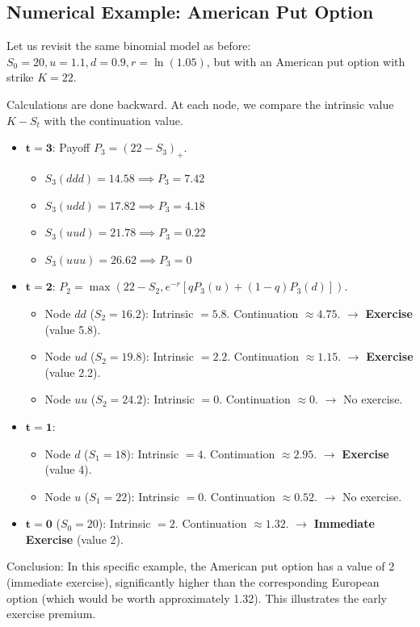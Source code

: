 \subsection{Numerical Example: American Put Option}
Let us revisit the same binomial model as before: $S_0=20, u=1.1, d=0.9, r=\ln(1.05)$, but with an American put option with strike $K=22$.

\begin{tcolorbox}[title=Decision Tree: Exercise or Wait?, colback=blue!5!white, colframe=blue!50!black]
Calculations are done backward. At each node, we compare the intrinsic value $K-S_t$ with the continuation value.
\begin{itemize}
    \item $\mathbf{t=3}$: Payoff $P_3 = (22 - S_3)_+$.
    \begin{itemize}
        \item $S_3(ddd) = 14.58 \implies P_3 = 7.42$
        \item $S_3(udd) = 17.82 \implies P_3 = 4.18$
        \item $S_3(uud) = 21.78 \implies P_3 = 0.22$
        \item $S_3(uuu) = 26.62 \implies P_3 = 0$
    \end{itemize}
    \item $\mathbf{t=2}$: $P_2 = \max(22-S_2, e^{-r}[q P_3(u) + (1-q) P_3(d)])$.
    \begin{itemize}
        \item Node $dd$ ($S_2=16.2$): Intrinsic $= 5.8$. Continuation $\approx 4.75$. $\to$ \textbf{Exercise} (value 5.8).
        \item Node $ud$ ($S_2=19.8$): Intrinsic $= 2.2$. Continuation $\approx 1.15$. $\to$ \textbf{Exercise} (value 2.2).
        \item Node $uu$ ($S_2=24.2$): Intrinsic $= 0$. Continuation $\approx 0$. $\to$ No exercise.
    \end{itemize}
    \item $\mathbf{t=1}$:
    \begin{itemize}
        \item Node $d$ ($S_1=18$): Intrinsic $= 4$. Continuation $\approx 2.95$. $\to$ \textbf{Exercise} (value 4).
        \item Node $u$ ($S_1=22$): Intrinsic $= 0$. Continuation $\approx 0.52$. $\to$ No exercise.
    \end{itemize}
    \item $\mathbf{t=0}$ ($S_0=20$): Intrinsic $= 2$. Continuation $\approx 1.32$. $\to$ \textbf{Immediate Exercise} (value 2).
\end{itemize}
\end{tcolorbox}
Conclusion: In this specific example, the American put option has a value of 2 (immediate exercise), significantly higher than the corresponding European option (which would be worth approximately 1.32). This illustrates the early exercise premium.

